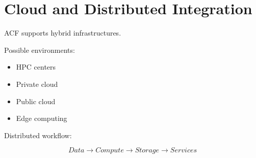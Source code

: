 \section{Cloud and Distributed Integration}


ACF supports hybrid infrastructures.



Possible environments:


\begin{itemize}

\item HPC centers

\item Private cloud

\item Public cloud

\item Edge computing

\end{itemize}



Distributed workflow:


\[
Data
\rightarrow
Compute
\rightarrow
Storage
\rightarrow
Services
\]
